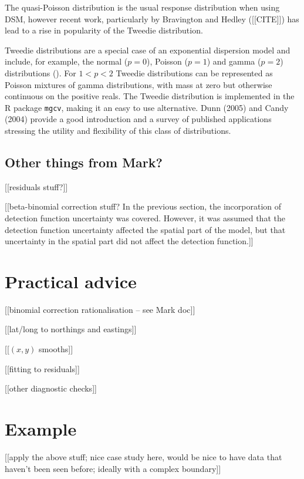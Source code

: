 \documentclass[useAMS,referee]{biom}
\begin{document}
The quasi-Poisson distribution is the usual response distribution when using DSM, however recent work, particularly by Bravington and Hedley ([[CITE]]) has lead to a rise in popularity of the Tweedie distribution. 


Tweedie distributions are a special case of an exponential dispersion model and include, for example, the normal ($p=0$), Poisson ($p=1$) and gamma ($p=2$) distributions (\cite{Jorgensen}). For $1<p<2$ Tweedie distributions can be represented as Poisson mixtures of gamma distributions, with mass at zero but otherwise continuous on the positive reals. The Tweedie distribution is implemented in the \textsf{R} package \texttt{mgcv}, making it an easy to use alternative. Dunn (2005) and Candy (2004) provide a good introduction and a survey of published applications stressing the utility and flexibility of this class of distributions.


\subsection{Other things from Mark?}

[[residuals stuff?]]

[[beta-binomial correction stuff?
In the previous section, the incorporation of detection function uncertainty was covered. However, it was assumed that the detection function uncertainty affected the spatial part of the model, but that uncertainty in the spatial part did not affect the detection function.]]


\section{Practical advice}

[[binomial correction rationalisation -- see Mark doc]]

[[lat/long to northings and eastings]]

[[$(x,y)$ smooths]]

[[fitting to residuals]]

[[other diagnostic checks]]

\section{Example}

[[apply the above stuff; nice case study here, would be nice to have data that haven't been seen before; ideally with a complex boundary]]
\end{document}

